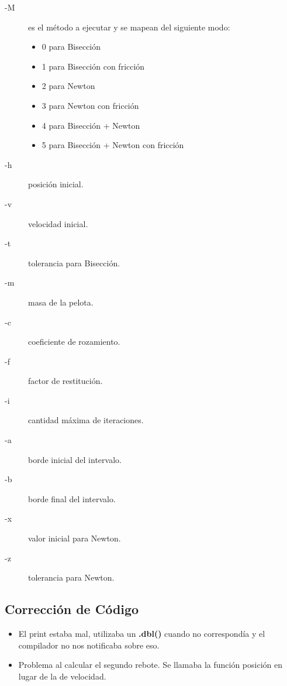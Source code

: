 \documentclass[a4paper]{article}
\begin{document}
\begin{description}
\item[-M] es el método a ejecutar y se mapean del siguiente modo:
\begin{itemize}
  \item 0 para Bisección
  \item 1 para Bisección con fricción
  \item 2 para Newton
  \item 3 para Newton con fricción
  \item 4 para Bisección + Newton
  \item 5 para Bisección + Newton con fricción
\end{itemize}
\item[-h] posición inicial.
\item[-v] velocidad inicial.
\item[-t] tolerancia para Bisección.
\item[-m] masa de la pelota.
\item[-c] coeficiente de rozamiento.
\item[-f] factor de restitución.
\item[-i] cantidad máxima de iteraciones.
\item[-a] borde inicial del intervalo.
\item[-b] borde final del intervalo.
\item[-x] valor inicial para Newton.
\item[-z] tolerancia para Newton.
\end{description}

\subsection{Corrección de Código}
\begin{itemize}
	\item El print estaba mal, utilizaba un \textbf{.dbl()} cuando no correspondía y el compilador no nos notificaba sobre eso.
	\item Problema al calcular el segundo rebote. Se llamaba la función posición en lugar de la de velocidad.
\end{itemize}


\end{document}
